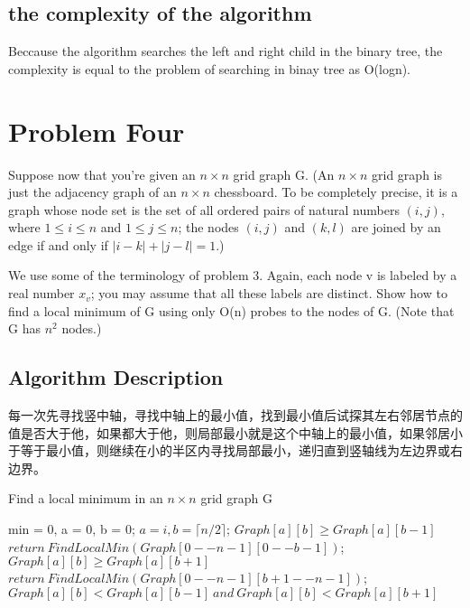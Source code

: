 \documentclass{article}
\begin{document}
\subsection{the complexity of the algorithm}

Beccause the algorithm searches the left and right child in the binary tree, the complexity is equal to the problem of searching in binay tree as O(logn).


\newpage
\section{Problem Four}
Suppose now that you're given an $n \times n$ grid graph G. (An $n \times n$ grid graph is just the adjacency graph of an $n\times n$ chessboard. To be completely precise, it is a graph whose node set is the set of all ordered pairs of natural numbers $(i,j)$, where $1 \leq i \leq n$ and $1 \leq j \leq n$; the nodes $(i,j)$ and $(k,l)$ are joined by an edge if and only if $|i-k|+|j-l| = 1$.)

We use some of the terminology of problem 3. Again, each node v is labeled by a real number $x_v$; you may assume that all these labels are distinct. Show how to find a local minimum of G using only O(n) probes to the nodes of G. (Note that G has $n^2$ nodes.)


\subsection{Algorithm Description}
每一次先寻找竖中轴，寻找中轴上的最小值，找到最小值后试探其左右邻居节点的值是否大于他，如果都大于他，则局部最小就是这个中轴上的最小值，如果邻居小于等于最小值，则继续在小的半区内寻找局部最小，递归直到竖轴线为左边界或右边界。


\begin{algorithm}[htbp]  
  \caption{Find a local minimum in an $n \times n$ grid graph G}  
  \begin{algorithmic}[1] 
	\State min = 0, a = 0, b = 0;
	\State $a = i, b = \lceil n/2 \rceil$;
	\EndIf
	\EndFor
	\EndIf
	\If $Graph[a][b] \geq Graph[a][b-1]$
	\State $return\ FindLocalMin(Graph[0--n-1][0--b-1])$;
	\EndIf
	\If $Graph[a][b] \geq Graph[a][b+1]$
	\State $return\ FindLocalMin(Graph[0--n-1][b+1--n-1])$;
	\EndIf
	\If $Graph[a][b] < Graph[a][b-1]\ and\ Graph[a][b] < Graph[a][b+1] $
	\EndIf
    \EndFunction  
  \end{algorithmic}  
\end{algorithm} 
\end{document}
